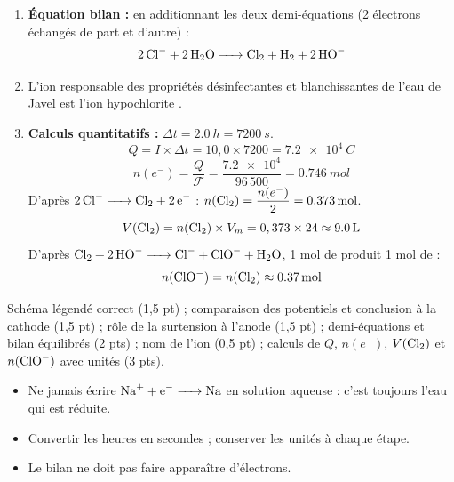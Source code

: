 \documentclass[11pt]{article}
\newcommand{\cle}[1]{{\popxbold\color{popdark}#1}}
\begin{document}
\begin{corrige}
\begin{enumerate}
\item \textbf{Équation bilan :} en additionnant les deux demi-équations (2 électrons échangés de part et d'autre) :
\[ \ce{2Cl- + 2H2O -> Cl2 + H2 + 2HO-} \]

\item L'ion responsable des propriétés désinfectantes et blanchissantes de l'eau de Javel est l'ion \cle{hypochlorite} .

\item \textbf{Calculs quantitatifs :} $\Delta t = \SI{2,0}{h} = \SI{7200}{s}$.
\[ Q = I \times \Delta t = 10,0 \times 7200 = \SI{7,2e4}{C} \]
\[ n(e^-) = \frac{Q}{\mathcal{F}} = \frac{\num{7,2e4}}{96\,500} = \SI{0,746}{mol} \]
D'après $\ce{2Cl- -> Cl2 + 2e-}$ : $n(\ce{Cl2}) = \dfrac{n(e^-)}{2} = \SI{0,373}{mol}$.
\[ V(\ce{Cl2}) = n(\ce{Cl2}) \times V_m = 0,373 \times 24 \approx \SI{9,0}{L} \]
D'après $\ce{Cl2 + 2HO- -> Cl- + ClO- + H2O}$, 1 mol de  produit 1 mol de  :
\[ n(\ce{ClO-}) = n(\ce{Cl2}) \approx \SI{0,37}{mol} \]
\end{enumerate}
\end{corrige}

\begin{attention}
Schéma légendé correct (1,5 pt) ; comparaison des potentiels et conclusion à la cathode (1,5 pt) ; rôle de la surtension à l'anode (1,5 pt) ; demi-équations et bilan équilibrés (2 pts) ; nom de l'ion  (0,5 pt) ; calculs de $Q$, $n(e^-)$, $V(\ce{Cl2})$ et $n(\ce{ClO-})$ avec unités (3 pts).
\begin{itemize}
\item Ne jamais écrire $\ce{Na+ + e- -> Na}$ en solution aqueuse : c'est toujours l'eau qui est réduite.
\item Convertir les heures en secondes ; conserver les unités à chaque étape.
\item Le bilan ne doit pas faire apparaître d'électrons.
\end{itemize}
\end{attention}
\end{document}
